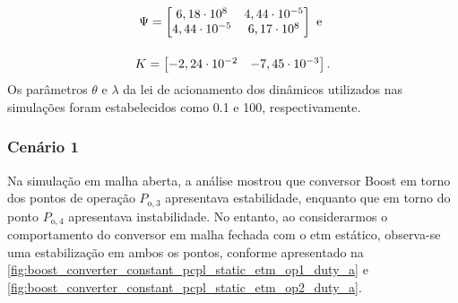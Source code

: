 \begin{gather}
  \Psi = \begin{bmatrix}
    6,18\cdot 10^{8}  & 4,44\cdot 10^{-5} \\
    4,44\cdot 10^{-5} & 6,17\cdot 10^{8}  \\
  \end{bmatrix} \text{ e } \notag \\[12pt]
  K = \begin{bmatrix}
    -2,24 \cdot 10^{-2} & -7,45\cdot 10^{-3}
  \end{bmatrix} . \notag
\end{gather} Os parâmetros $\theta$ e $\lambda$ da lei de acionamento dos  dinâmicos utilizados nas simulações foram estabelecidos como 0.1 e 100, respectivamente.

\subsubsection{Cenário 1}

Na simulação em malha aberta, a análise mostrou que conversor Boost em torno dos pontos de operação $P_{\mathrm{o}, 3}$ apresentava estabilidade, enquanto que em torno do ponto $P_{\mathrm{o}, 4}$ apresentava instabilidade. No entanto, ao considerarmos o comportamento do conversor em malha fechada com o \acrshort{etm} estático, observa-se uma estabilização em ambos os pontos, conforme apresentado na \autoref{fig:boost_converter_constant_pcpl_static_etm_op1_duty_a} e \autoref{fig:boost_converter_constant_pcpl_static_etm_op2_duty_a}. 

